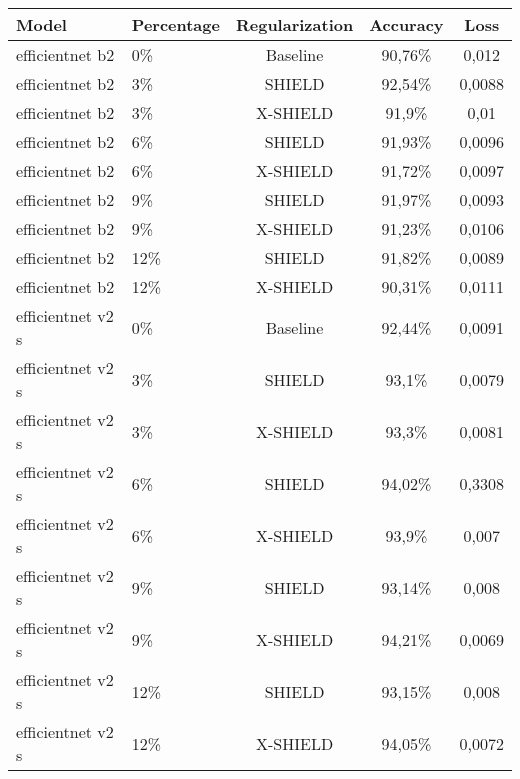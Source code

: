 \begin{tabular}{llccc}
\toprule
Model & Percentage & Regularization & Accuracy & Loss \\
\midrule
efficientnet b2 & 0\% & Baseline & 90,76\% & 0,012 \\
efficientnet b2 & 3\% & SHIELD & 92,54\% & 0,0088 \\
efficientnet b2 & 3\% & X-SHIELD & 91,9\% & 0,01 \\
efficientnet b2 & 6\% & SHIELD & 91,93\% & 0,0096 \\
efficientnet b2 & 6\% & X-SHIELD & 91,72\% & 0,0097 \\
efficientnet b2 & 9\% & SHIELD & 91,97\% & 0,0093 \\
efficientnet b2 & 9\% & X-SHIELD & 91,23\% & 0,0106 \\
efficientnet b2 & 12\% & SHIELD & 91,82\% & 0,0089 \\
efficientnet b2 & 12\% & X-SHIELD & 90,31\% & 0,0111 \\
efficientnet v2 s & 0\% & Baseline & 92,44\% & 0,0091 \\
efficientnet v2 s & 3\% & SHIELD & 93,1\% & 0,0079 \\
efficientnet v2 s & 3\% & X-SHIELD & 93,3\% & 0,0081 \\
efficientnet v2 s & 6\% & SHIELD & 94,02\% & 0,3308 \\
efficientnet v2 s & 6\% & X-SHIELD & 93,9\% & 0,007 \\
efficientnet v2 s & 9\% & SHIELD & 93,14\% & 0,008 \\
efficientnet v2 s & 9\% & X-SHIELD & 94,21\% & 0,0069 \\
efficientnet v2 s & 12\% & SHIELD & 93,15\% & 0,008 \\
efficientnet v2 s & 12\% & X-SHIELD & 94,05\% & 0,0072 \\
\bottomrule
\end{tabular}
